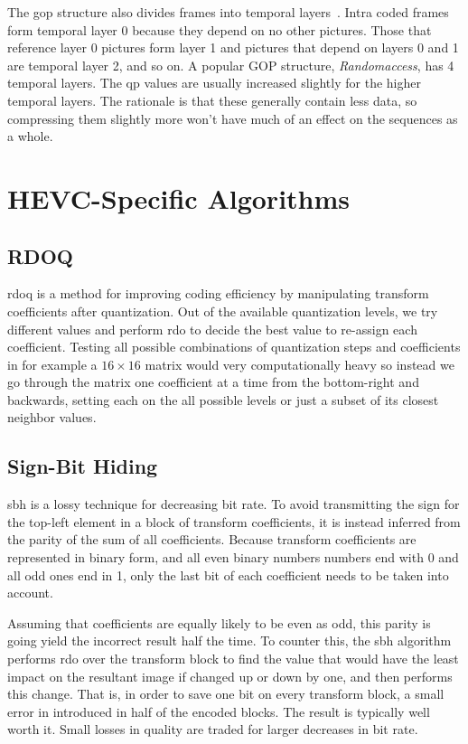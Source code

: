 The \gls{gop} structure also divides frames into temporal layers~\cite{Wiegand}. Intra coded frames form temporal layer 0 because they depend on no other pictures. Those that reference layer 0 pictures form layer 1 and pictures that depend on layers 0 and 1 are temporal layer 2, and so on. A popular GOP structure, \textit{Randomaccess}, has 4 temporal layers. The \gls{qp} values are usually increased slightly for the higher temporal layers. The rationale is that these generally contain less data, so compressing them slightly more won't have much of an effect on the sequences as a whole.


\section{HEVC-Specific Algorithms}

\subsection{RDOQ}
\Gls{rdoq} is a method for improving coding efficiency by manipulating transform coefficients after quantization. Out of the available quantization levels, we try different values and perform \gls{rdo} to decide the best value to re-assign each coefficient. Testing all possible combinations of quantization steps and coefficients in for example a $16 \times 16$ matrix would very computationally heavy so instead we go through the matrix one coefficient at a time from the bottom-right and backwards, setting each on the all possible levels or just a subset of its closest neighbor values.

\subsection{Sign-Bit Hiding}
\Gls{sbh} is a lossy technique for decreasing bit rate. To avoid transmitting the sign for the top-left element in a block of transform coefficients, it is instead inferred from the parity of the sum of all coefficients. Because transform coefficients are represented in binary form, and all even binary numbers numbers end with 0 and all odd ones end in 1, only the last bit of each coefficient needs to be taken into account.

Assuming that coefficients are equally likely to be even as odd, this parity is going yield the incorrect result half the time. To counter this, the \gls{sbh} algorithm performs \gls{rdo} over the transform block to find the value that would have the least impact on the resultant image if changed up or down by one, and then performs this change. That is, in order to save one bit on every transform block, a small error in introduced in half of the encoded blocks. The result is typically well worth it. Small losses in quality are traded for larger decreases in bit rate.

